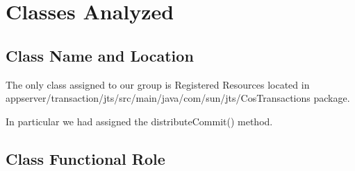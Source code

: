 \section{Classes Analyzed}
\subsection{Class Name and Location}
	The only class assigned to our group is \ttfamily Registered Resources \normalfont located in \ttfamily appserver/transaction/jts/src/main/java/com/sun/jts/CosTransactions \normalfont package.
	
	In particular we had assigned the \ttfamily distributeCommit() \normalfont method.
	
	
	
\subsection{Class Functional Role}